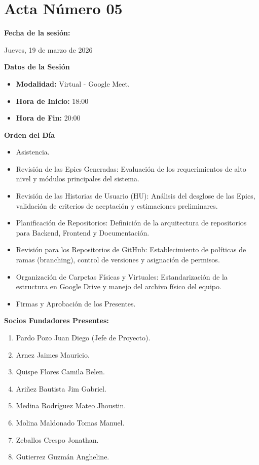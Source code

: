 \newpage
\section{Acta Número 05}
\label{sec:acta05}

\noindent \textbf{Fecha de la sesión:}\par
Jueves, 19 de marzo de 2026

\vspace*{0.5cm}
\noindent \textbf{Datos de la Sesión}
\vspace{-0.2cm}
\begin{itemize}[noitemsep]
    \item \textbf{Modalidad:} Virtual - Google Meet.
    \item \textbf{Hora de Inicio:} 18:00
    \item \textbf{Hora de Fin:} 20:00
\end{itemize}

\vspace*{0.5cm}
\noindent \textbf{Orden del Día}
\vspace{-0.2cm}
\begin{itemize}[noitemsep]
    \item Asistencia.
    \item Revisión de las Epics Generadas: Evaluación de los requerimientos de alto nivel y módulos principales del sistema.
    \item Revisión de las Historias de Usuario (HU): Análisis del desglose de las Epics, validación de criterios de aceptación y estimaciones preliminares.
    \item Planificación de Repositorios: Definición de la arquitectura de repositorios para Backend, Frontend y Documentación.
    \item Revisión para los Repositorios de GitHub: Establecimiento de políticas de ramas (branching), control de versiones y asignación de permisos.
    \item Organización de Carpetas Físicas y Virtuales: Estandarización de la estructura en Google Drive y manejo del archivo físico del equipo.
    \item Firmas y Aprobación de los Presentes.
\end{itemize}

\vspace*{0.5cm}
\noindent \textbf{Socios Fundadores Presentes:}
\vspace{-0.2cm}
\begin{enumerate}[noitemsep]
    \item Pardo Pozo Juan Diego (Jefe de Proyecto).
    \item Arnez Jaimes Mauricio.
    \item Quispe Flores Camila Belen.
    \item Ariñez Bautista Jim Gabriel.
    \item Medina Rodríguez Mateo Jhoustin.
    \item Molina Maldonado Tomas Manuel.
    \item Zeballos Crespo Jonathan.
    \item Gutierrez Guzmán Angheline.
\end{enumerate}

